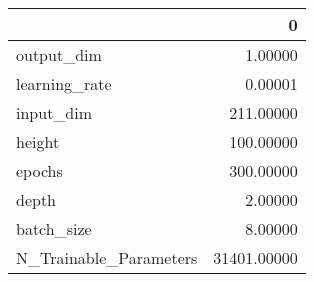 \begin{tabular}{lr}
\toprule
{} &            0 \\
\midrule
output\_dim             &      1.00000 \\
learning\_rate          &      0.00001 \\
input\_dim              &    211.00000 \\
height                 &    100.00000 \\
epochs                 &    300.00000 \\
depth                  &      2.00000 \\
batch\_size             &      8.00000 \\
N\_Trainable\_Parameters &  31401.00000 \\
\bottomrule
\end{tabular}
